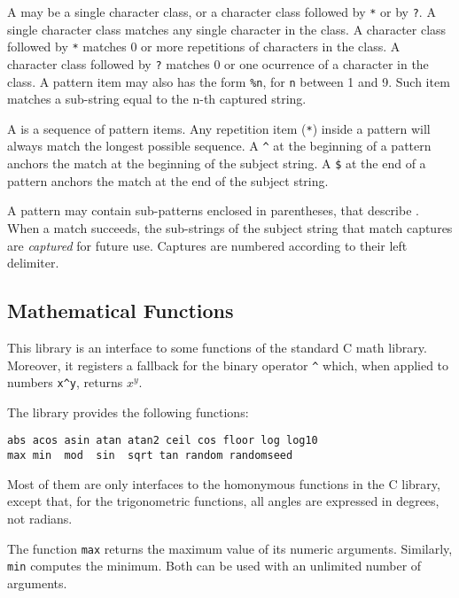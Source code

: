 A  may be a single character class,
or a character class followed by \verb'*' or by \verb'?'.
A single character class matches any single character in the class.
A character class followed by \verb'*' matches 0 or more repetitions
of characters in the class.
A character class followed by \verb'?' matches 0 or one ocurrence
of a character in the class.
A pattern item may also has the form \verb'%n',
for \verb-n- between 1 and 9.
Such item matches a sub-string equal to the n-th captured string.

A  is a sequence of pattern items.
Any repetition item (\verb'*') inside a pattern will always
match the longest possible sequence.
A \verb'^' at the beginning of a pattern anchors the match at the
beginning of the subject string.
A \verb'$' at the end of a pattern anchors the match at the
end of the subject string.

A pattern may contain sub-patterns enclosed in parentheses,
that describe .
When a match succeeds, the sub-strings of the subject string
that match captures are {\em captured} for future use.
Captures are numbered according to their left delimiter.

\subsection{Mathematical Functions} \label{mathlib}

This library is an interface to some functions of the standard C math library.
Moreover, it registers a fallback for the binary operator \verb'^' which,
when applied to numbers \verb'x^y', returns $x^y$.

The library provides the following functions:
\begin{verbatim}
abs acos asin atan atan2 ceil cos floor log log10
max min  mod  sin  sqrt tan random randomseed
\end{verbatim}
Most of them
are only interfaces to the homonymous functions in the C library,
except that, for the trigonometric functions,
all angles are expressed in degrees, not radians.

The function \verb'max' returns the maximum
value of its numeric arguments.
Similarly, \verb'min' computes the minimum.
Both can be used with an unlimited number of arguments.

